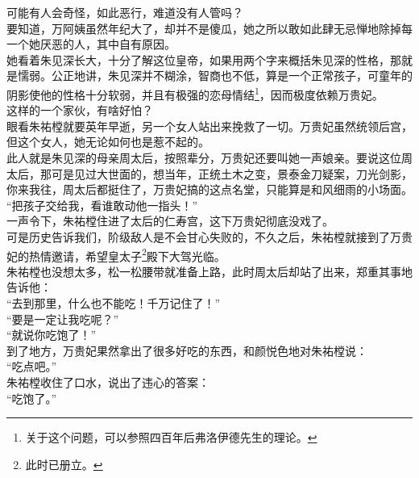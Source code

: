 \begin{multicols}{\theparacolNo}
可能有人会奇怪，如此恶行，难道没有人管吗？\\

要知道，万阿姨虽然年纪大了，却并不是傻瓜，她之所以敢如此肆无忌惮地除掉每一个她厌恶的人，其中自有原因。\\

她看着朱见深长大，十分了解这位皇帝，如果用两个字来概括朱见深的性格，那就是懦弱。公正地讲，朱见深并不糊涂，智商也不低，算是一个正常孩子，可童年的阴影使他的性格十分软弱，并且有极强的恋母情结\footnote{关于这个问题，可以参照四百年后弗洛伊德先生的理论。}，因而极度依赖万贵妃。\\

这样的一个家伙，有啥好怕？\\

眼看朱祐樘就要英年早逝，另一个女人站出来挽救了一切。万贵妃虽然统领后宫，但这个女人，她无论如何也是惹不起的。\\

此人就是朱见深的母亲周太后，按照辈分，万贵妃还要叫她一声娘亲。要说这位周太后，那可是见过大世面的，想当年，正统土木之变，景泰金刀疑案，刀光剑影，你来我往，周太后都挺住了，万贵妃搞的这点名堂，只能算是和风细雨的小场面。\\

“把孩子交给我，看谁敢动他一指头！”\\

一声令下，朱祐樘住进了太后的仁寿宫，这下万贵妃彻底没戏了。\\

可是历史告诉我们，阶级敌人是不会甘心失败的，不久之后，朱祐樘就接到了万贵妃的热情邀请，希望皇太子\footnote{此时已册立。}殿下大驾光临。\\

朱祐樘也没想太多，松一松腰带就准备上路，此时周太后却站了出来，郑重其事地告诉他：\\

“去到那里，什么也不能吃！千万记住了！”\\

“要是一定让我吃呢？”\\

“就说你吃饱了！”\\

到了地方，万贵妃果然拿出了很多好吃的东西，和颜悦色地对朱祐樘说：\\

“吃点吧。”\\

朱祐樘收住了口水，说出了违心的答案：\\

“吃饱了。”\\


\end{multicols}
